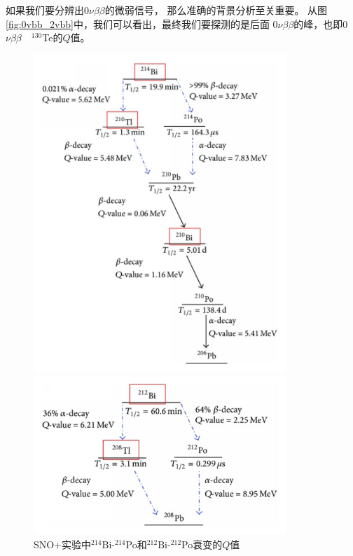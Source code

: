 如果我们要分辨出0$\nu\beta\beta$的微弱信号，
那么准确的背景分析至关重要。
从图\ref{fig:0vbb_2vbb}中，我们可以看出，最终我们要探测的是后面
0$\nu\beta\beta$的峰，也即0$\nu\beta\beta\quad{}^{130}$Te的$Q$值。
\begin{figure}[htbp]
    \centering
    \begin{minipage}[htbp]{0.45\textwidth}
        \centering
        \includegraphics[width=0.85\textwidth]{figures/BiPo214.png}
    \end{minipage}
    \hfill %
    \begin{minipage}[htbp]{0.45\textwidth}
        \centering
        \includegraphics[width=0.85\textwidth]{figures/BiPo212.png}
    \end{minipage}
    \caption{SNO+实验中${}^{214}$Bi-${}^{214}$Po和${}^{212}$Bi-${}^{212}$Po衰变的$Q$值\cite{andringa2016current}}
    \label{fig:bipo212/214}
\end{figure}

